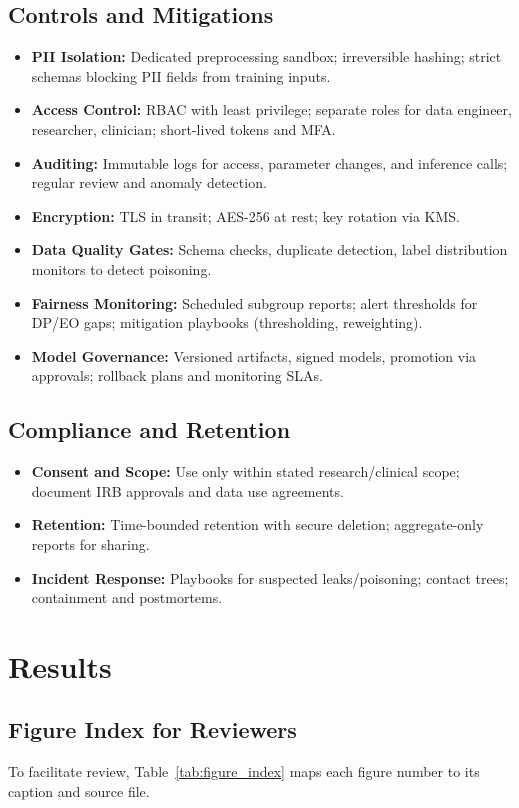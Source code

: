 \documentclass[conference]{IEEEtran}
\begin{document}
\subsection{Controls and Mitigations}
\begin{itemize}
  \item \textbf{PII Isolation:} Dedicated preprocessing sandbox; irreversible hashing; strict schemas blocking PII fields from training inputs.
  \item \textbf{Access Control:} RBAC with least privilege; separate roles for data engineer, researcher, clinician; short-lived tokens and MFA.
  \item \textbf{Auditing:} Immutable logs for access, parameter changes, and inference calls; regular review and anomaly detection.
  \item \textbf{Encryption:} TLS in transit; AES-256 at rest; key rotation via KMS.
  \item \textbf{Data Quality Gates:} Schema checks, duplicate detection, label distribution monitors to detect poisoning.
  \item \textbf{Fairness Monitoring:} Scheduled subgroup reports; alert thresholds for DP/EO gaps; mitigation playbooks (thresholding, reweighting).
  \item \textbf{Model Governance:} Versioned artifacts, signed models, promotion via approvals; rollback plans and monitoring SLAs.
\end{itemize}

\subsection{Compliance and Retention}
\begin{itemize}
  \item \textbf{Consent and Scope:} Use only within stated research/clinical scope; document IRB approvals and data use agreements.
  \item \textbf{Retention:} Time-bounded retention with secure deletion; aggregate-only reports for sharing.
  \item \textbf{Incident Response:} Playbooks for suspected leaks/poisoning; contact trees; containment and postmortems.
\end{itemize}

\section{Results}

\subsection{Figure Index for Reviewers}
To facilitate review, Table~\ref{tab:figure_index} maps each figure number to its caption and source file.
\end{document}
